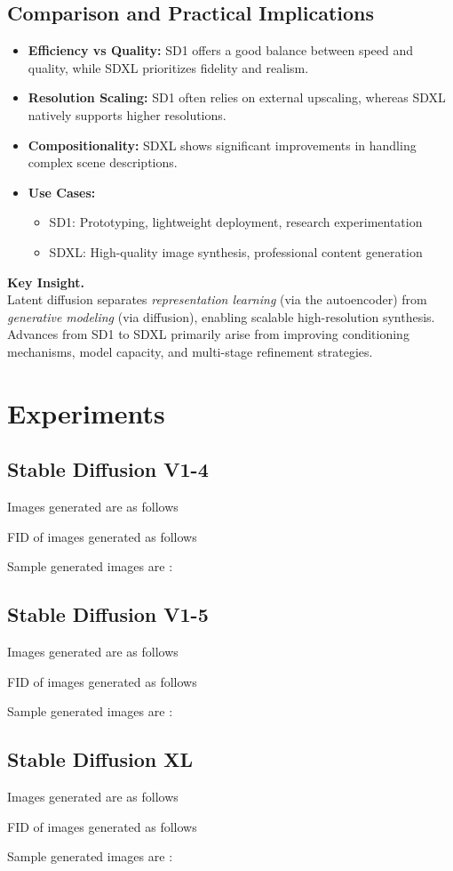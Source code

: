 \subsection{Comparison and Practical Implications}

\begin{itemize}
    \item \textbf{Efficiency vs Quality:}  
    SD1 offers a good balance between speed and quality, while SDXL prioritizes fidelity and realism.

    \item \textbf{Resolution Scaling:}  
    SD1 often relies on external upscaling, whereas SDXL natively supports higher resolutions.

    \item \textbf{Compositionality:}  
    SDXL shows significant improvements in handling complex scene descriptions.

    \item \textbf{Use Cases:}
    \begin{itemize}
        \item SD1: Prototyping, lightweight deployment, research experimentation
        \item SDXL: High-quality image synthesis, professional content generation
    \end{itemize}
\end{itemize}

\vspace{0.5em}
\noindent
\textbf{Key Insight.} \\
Latent diffusion separates \textit{representation learning} (via the autoencoder) from \textit{generative modeling} (via diffusion), enabling scalable high-resolution synthesis. Advances from SD1 to SDXL primarily arise from improving conditioning mechanisms, model capacity, and multi-stage refinement strategies.


\section{Experiments}

\subsection{Stable Diffusion V1-4}
Images generated are as follows

FID of images generated as follows

Sample generated images are : 


\subsection{Stable Diffusion V1-5}
Images generated are as follows

FID of images generated as follows

Sample generated images are : 


\subsection{Stable Diffusion XL}

Images generated are as follows

FID of images generated as follows

Sample generated images are : 


